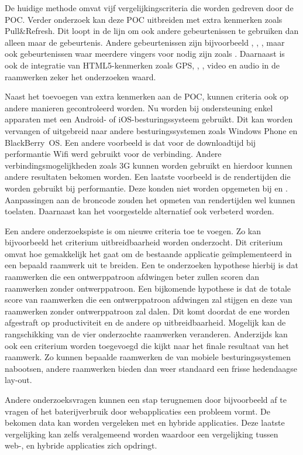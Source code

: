 De huidige methode omvat vijf vergelijkingscriteria die worden gedreven door de POC.
Verder onderzoek kan deze POC uitbreiden met extra kenmerken zoals Pull\&Refresh.
Dit loopt in de lijn om ook andere gebeurtenissen te gebruiken dan alleen maar de  gebeurtenis.
Andere gebeurtenissen zijn bijvoorbeeld , , , maar ook gebeurtenissen waar meerdere vingers voor nodig zijn zoals .
Daarnaast is ook de integratie van HTML5-kenmerken zoals GPS, , , video en audio in de raamwerken zeker het onderzoeken waard.

Naast het toevoegen van extra kenmerken aan de POC, kunnen criteria ook op andere manieren gecontroleerd worden.
Nu worden bij ondersteuning enkel apparaten met een Android- of iOS-besturingssysteem gebruikt.
Dit kan worden vervangen of uitgebreid naar andere besturingssystemen zoals Windows Phone en BlackBerry~OS.
Een andere voorbeeld is dat voor de downloadtijd bij performantie Wifi werd gebruikt voor de verbinding.
Andere verbindingsmogelijkheden zoals 3G kunnen worden gebruikt en hierdoor kunnen andere resultaten bekomen worden.
Een laatste voorbeeld is de rendertijden die worden gebruikt bij performantie.
Deze konden niet worden opgemeten bij \st{} en \lungo{}.
Aanpassingen aan de broncode zouden het opmeten van rendertijden wel kunnen toelaten.
Daarnaast kan het voorgestelde alternatief ook verbeterd worden.

Een andere onderzoekspiste is om nieuwe criteria toe te voegen.
Zo kan bijvoorbeeld het criterium uitbreidbaarheid worden onderzocht.
Dit criterium omvat hoe gemakkelijk het gaat om de bestaande applicatie geïmplementeerd in een bepaald raamwerk uit te breiden.
Een te onderzoeken hypothese hierbij is dat raamwerken die een ontwerppatroon afdwingen beter zullen scoren dan raamwerken zonder ontwerppatroon.
Een bijkomende hypothese is dat de totale score van raamwerken die een ontwerppatroon afdwingen zal stijgen en deze van raamwerken zonder ontwerppatroon zal dalen.
Dit komt doordat de ene worden afgestraft op productiviteit en de andere op uitbreidbaarheid.
Mogelijk kan de rangschikking van de vier onderzochte raamwerken veranderen.
Anderzijds kan ook een criterium worden toegevoegd die kijkt naar het finale resultaat van het raamwerk.
Zo kunnen bepaalde raamwerken de  van mobiele besturingssystemen  nabootsen, andere raamwerken bieden dan weer standaard een frisse hedendaagse lay-out.

Andere onderzoeksvragen kunnen een stap terugnemen door bijvoorbeeld af te vragen of het baterijverbruik door webapplicaties een probleem vormt.
De bekomen data kan worden vergeleken met  en hybride applicaties.
Deze laatste vergelijking kan zelfs veralgemeend worden waardoor een vergelijking tussen web-,  en hybride applicaties zich opdringt. 


